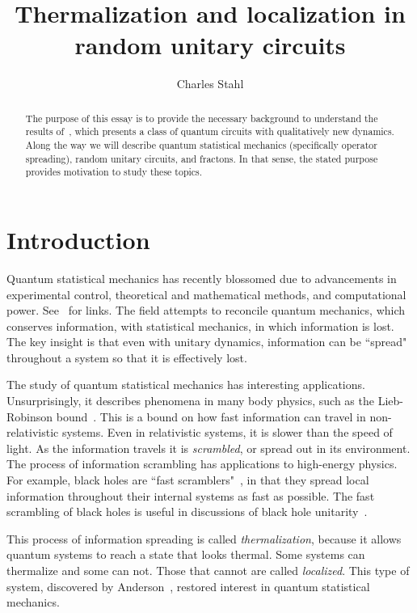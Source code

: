 \documentclass[a4paper,11pt]{article}
\title{Thermalization and localization in random unitary circuits}
\author{Charles Stahl}
\begin{document}
\maketitle

\begin{abstract}

The purpose of this essay is to provide the necessary background to understand the results of~\cite{PaiFracton}, which presents a class of quantum circuits with qualitatively new dynamics. Along the way we will describe quantum statistical mechanics (specifically operator spreading), random unitary circuits, and fractons. In that sense, the stated purpose provides motivation to study these topics.

\end{abstract}

\section{Introduction} \label{sec:intro}

Quantum statistical mechanics has recently blossomed due to advancements in experimental control, theoretical and mathematical methods, and computational power. See~\cite{GogolinStatMech, PolkovnikovClosed} for links. The field attempts to reconcile quantum mechanics, which conserves information, with statistical mechanics, in which information is lost. The key insight is that even with unitary dynamics, information can be ``spread" throughout a system so that it is effectively lost.

The study of quantum statistical mechanics has interesting applications. Unsurprisingly, it describes phenomena in many body physics, such as the Lieb-Robinson bound~\cite{Lieb72, RobertsSwingle}. This is a bound on how fast information can travel in non-relativistic systems. Even in relativistic systems, it is slower than the speed of light. As the information travels it is \emph{scrambled}, or spread out in its environment. The process of information scrambling has applications to high-energy physics. For example, black holes are ``fast scramblers"~\cite{SekinoSusskind}, in that they spread local information throughout their internal systems as fast as possible. The fast scrambling of black holes is useful in discussions of black hole unitarity~\cite{HaydenPreskill}.

This process of information spreading is called \emph{thermalization}, because it allows quantum systems to reach a state that looks thermal. Some systems can thermalize and some can not. Those that cannot are called \emph{localized}. This type of system, discovered by Anderson~\cite{AndersonDiff}, restored interest in quantum statistical mechanics.
\end{document}
